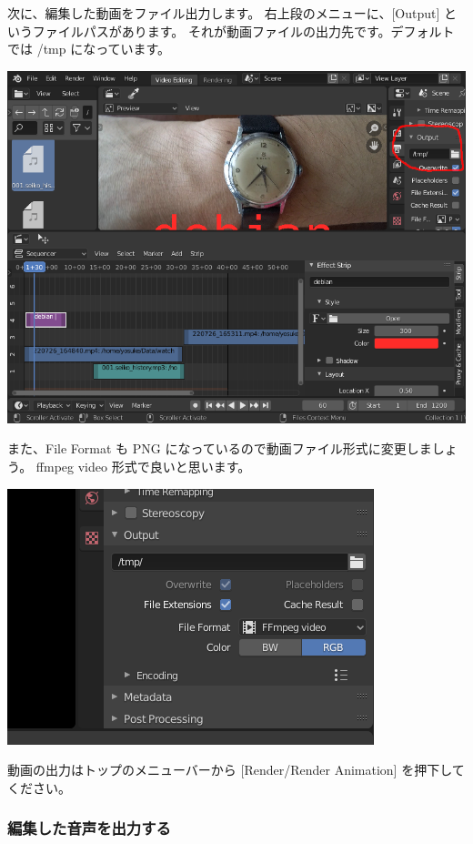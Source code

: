 \documentclass[mingoth,a4paper]{jsarticle}
\begin{document}
次に、編集した動画をファイル出力します。
右上段のメニューに、[Output] というファイルパスがあります。
それが動画ファイルの出力先です。デフォルトでは /tmp になっています。

\begin{center}
\includegraphics[scale=0.3]{image202209/blender_output.png}
\end{center}

また、File Format も PNG になっているので動画ファイル形式に変更しましょう。
ffmpeg video 形式で良いと思います。

\begin{center}
\includegraphics[scale=0.3]{image202209/blender_output_params.png}
\end{center}

動画の出力はトップのメニューバーから [Render/Render Animation] を押下してください。

\subsubsection{編集した音声を出力する}
\end{document}
